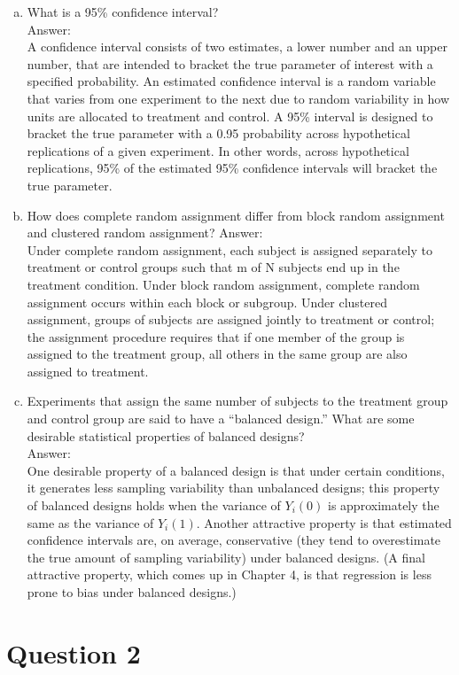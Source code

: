 \documentclass[11pt,notitlepage]{article}\usepackage[]{graphicx}\usepackage[]{color}
\makeatletter
\newenvironment{kframe}{%
 \def\at@end@of@kframe{}%
 \ifinner\ifhmode%
  \def\at@end@of@kframe{\end{minipage}}%
  \begin{minipage}{\columnwidth}%
 \fi\fi%
 \def\FrameCommand##1{\hskip\@totalleftmargin \hskip-\fboxsep
 \colorbox{shadecolor}{##1}\hskip-\fboxsep
     \hskip-\linewidth \hskip-\@totalleftmargin \hskip\columnwidth}%
 \MakeFramed {\advance\hsize-\width
   \@totalleftmargin\z@ \linewidth\hsize
   \@setminipage}}%
 {\par\unskip\endMakeFramed%
 \at@end@of@kframe}
\newenvironment{knitrout}{}{} %
\makeatother
\begin{document}
\begin{enumerate}[a)]
\item What is a 95\% confidence interval?  \\
Answer:\\ 
A confidence interval consists of two estimates, a lower number and an upper number, that are intended to bracket the true parameter of interest with a specified probability. An estimated confidence interval is a random variable that varies from one experiment to the next due to random variability in how units are allocated to treatment and control. A 95\% interval is designed to bracket the true parameter with a 0.95 probability across hypothetical replications of a given experiment.  In other words, across hypothetical replications, 95\% of the estimated 95\% confidence intervals will bracket the true parameter.  
\item How does complete random assignment differ from block random assignment and clustered random assignment?
Answer:\\
Under complete random assignment, each subject is assigned separately to treatment or control groups such that m of N subjects end up in the treatment condition. Under block random assignment, complete random assignment occurs within each block or subgroup. Under clustered assignment, groups of subjects are assigned jointly to treatment or control; the assignment procedure requires that if one member of the group is assigned to the treatment group, all others in the same group are also assigned to treatment. 
\item Experiments that assign the same number of subjects to the treatment group and control group are said to have a ``balanced design.''  What are some desirable statistical properties of balanced designs?\\
Answer:\\
One desirable property of a balanced design is that under certain conditions, it generates less sampling variability than unbalanced designs; this property of balanced designs holds when the variance of $Y_i(0)$ is approximately the same as the variance of $Y_i (1)$. Another attractive property is that estimated confidence intervals are, on average, conservative (they tend to overestimate the true amount of sampling variability) under balanced designs. (A final attractive property, which comes up in Chapter 4, is that regression is less prone to bias under balanced designs.)
\end{enumerate}

\section*{Question 2}
\begin{knitrout}
\color{fgcolor}\begin{kframe}
\begin{verbatim}






\end{verbatim}
\end{kframe}
\end{knitrout}
\end{document}
